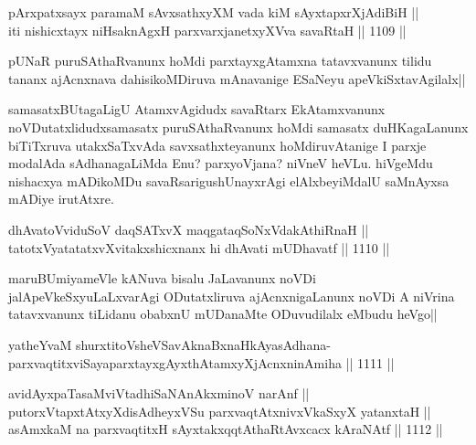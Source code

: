 \begin{shl}
pArxpatxsayx paramaM sAvxsathxyXM vada kiM sAyxtapxrXjAdiBiH || \\
iti nishicxtayx niHsaknAgxH parxvarxjanetxyXVva savaRtaH ||  1109 ||  
\end{shl}

\begin{artha}
pUNaR puruSAthaRvanunx hoMdi parxtayxgAtamxna tatavxvanunx tilidu tananx ajAcnxnava dahisikoMDiruva mAnavanige ESaNeyu apeVkiSxtavAgilalx||
\end{artha}

\begin{artha}
samasatxBUtagaLigU AtamxvAgidudx savaRtarx EkAtamxvanunx noVDutatxlidudxsamasatx puruSAthaRvanunx hoMdi samasatx duHKagaLanunx biTiTxruva utakxSaTxvAda savxsathxteyanunx hoMdiruvAtanige I parxje modalAda sAdhanagaLiMda Enu? parxyoVjana? niVneV heVLu. hiVgeMdu nishacxya mADikoMDu savaRsarigushUnayxrAgi elAlxbeyiMdalU saMnAyxsa mADiye irutAtxre.
\end{artha}


\begin{shl}
dhAvatoV\s viduSoV daqSATxvX maqgataqSoNxVdakAthiRnaH || \\
tatotxVyatatatxvXvitakxshicxnanx hi dhAvati mUDhavatf ||  1110 ||  
\end{shl}

\begin{artha}
maruBUmiyameVle kANuva bisalu JaLavanunx noVDi jalApeVkeSxyuLaLxvarAgi ODutatxliruva ajAcnxnigaLanunx noVDi A niVrina tatavxvanunx tiLidanu obabxnU mUDanaMte ODuvudilalx eMbudu heVgo||
\end{artha}


\begin{shl}
yatheYvaM shurxtitoV\s sheVSavAknaBxnaHkAyasAdhana-\\
parxvaqtitxviSayaparxtayxgAyxthAtamxyXjAcnxninAmiha ||  1111 ||  
\end{shl}
				
\begin{shl}
avidAyxpaTasaMviVtadhiSaNAnAkxminoV narAnf ||  \\
putorxVtapxtAtxyXdisAdheyxVSu parxvaqtAtxnivxVkaSxyX yatanxtaH || \\
asAmxkaM na parxvaqtitxH sAyxtakxqqtAthaRtAvxcacx kAraNAtf ||  1112 ||  
\end{shl}

